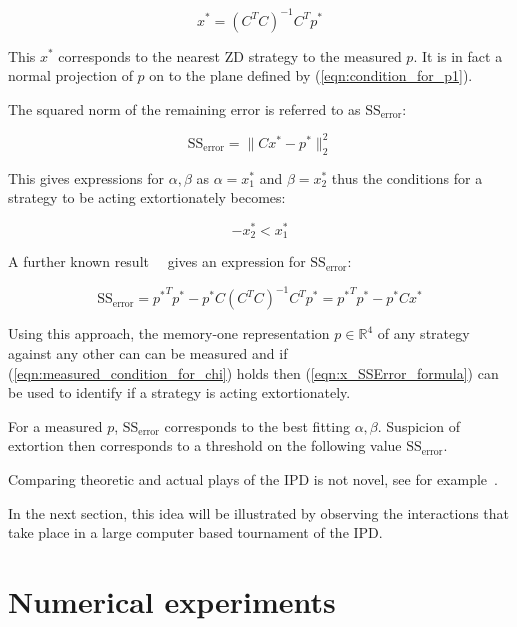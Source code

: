 \documentclass[a4paper]{article}
\newcommand{\SSe}{\text{SS}_{\text{error}}}
\begin{document}
\begin{equation}\label{eqn:x_star_formula}
    x^* = {\left(C^{T}C\right)}^{-1}C^{T}p^{*}
\end{equation}

This \(x^*\) corresponds to the nearest ZD strategy to the
measured \(p\). It is in fact a normal projection of \(p\) on to the plane
defined by (\ref{eqn:condition_for_p1}).

The squared norm of the remaining error is referred to as
\(\SSe\):

\begin{equation}\label{eqn:r_squared}
    \SSe = \|C x^*- p^*\|_2^2
\end{equation}

This gives expressions for \(\alpha, \beta\) as \(\alpha=x^*_1\) and
\(\beta=x^*_2\) thus the conditions for a strategy to be acting extortionately
becomes:

\begin{equation}
    -x^*_2 < x^*_1 \label{eqn:measured_condition_for_chi}
\end{equation}

A further known result~~\cite{kutner2004applied, rao1973linear,
wakefield2013bayesian} gives an expression for
\(\SSe\):

\begin{equation}\label{eqn:x_SSError_formula}
    \SSe = {p ^ *} ^ T p ^ * -
           p ^ * C \left(C ^ T C \right) ^ {-1} C ^ T p ^ *
         = {p ^ *} ^ T p ^ * - p ^ * C x ^ *
\end{equation}

Using this approach, the memory-one representation \(p\in\mathbb{R}^4\) of any
strategy against any other can can be measured and if
(\ref{eqn:measured_condition_for_chi}) holds then (\ref{eqn:x_SSError_formula})
can be used to identify if a strategy is acting extortionately.

For a measured \(p\), \(\SSe\) corresponds to the best
fitting \(\alpha, \beta\). Suspicion of
extortion then corresponds to a threshold on the following value
\(\SSe\).

Comparing theoretic and actual plays of the
IPD is not novel, see for example~\cite{Rand2013}.

In the next section, this idea will be illustrated by observing the interactions
that take place in a large computer based tournament of the IPD\@.

\section{Numerical experiments}\label{sec:numerical-experiments}
\end{document}
